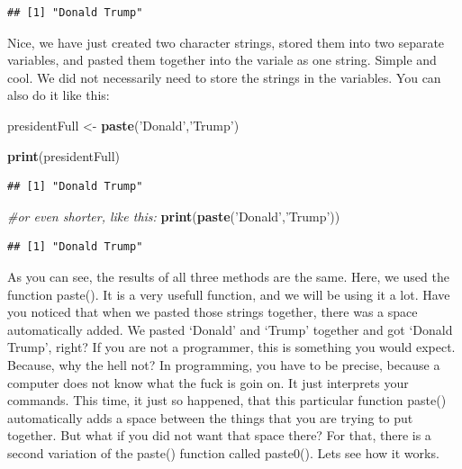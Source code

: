 \documentclass[]{book}
\newenvironment{Shaded}{\begin{snugshade}}{\end{snugshade}}
\newcommand{\CommentTok}[1]{\textcolor[rgb]{0.56,0.35,0.01}{\textit{#1}}}
\newcommand{\KeywordTok}[1]{\textcolor[rgb]{0.13,0.29,0.53}{\textbf{#1}}}
\newcommand{\NormalTok}[1]{#1}
\newcommand{\StringTok}[1]{\textcolor[rgb]{0.31,0.60,0.02}{#1}}
\begin{document}
\begin{verbatim}
## [1] "Donald Trump"
\end{verbatim}

Nice, we have just created two character strings, stored them into two separate variables, and pasted them together into the variale as one string. Simple and cool. We did not necessarily need to store the strings in the variables. You can also do it like this:

\begin{Shaded}
\begin{Highlighting}[]
\NormalTok{presidentFull <-}\StringTok{ }\KeywordTok{paste}\NormalTok{(}\StringTok{'Donald'}\NormalTok{,}\StringTok{'Trump'}\NormalTok{)}

\KeywordTok{print}\NormalTok{(presidentFull)}
\end{Highlighting}
\end{Shaded}

\begin{verbatim}
## [1] "Donald Trump"
\end{verbatim}

\begin{Shaded}
\begin{Highlighting}[]
\CommentTok{#or even shorter, like this:}
\KeywordTok{print}\NormalTok{(}\KeywordTok{paste}\NormalTok{(}\StringTok{'Donald'}\NormalTok{,}\StringTok{'Trump'}\NormalTok{))}
\end{Highlighting}
\end{Shaded}

\begin{verbatim}
## [1] "Donald Trump"
\end{verbatim}

As you can see, the results of all three methods are the same. Here, we used the function paste(). It is a very usefull function, and we will be using it a lot. Have you noticed that when we pasted those strings together, there was a space automatically added. We pasted `Donald' and `Trump' together and got `Donald Trump', right? If you are not a programmer, this is something you would expect. Because, why the hell not? In programming, you have to be precise, because a computer does not know what the fuck is goin on. It just interprets your commands. This time, it just so happened, that this particular function paste() automatically adds a space between the things that you are trying to put together. But what if you did not want that space there? For that, there is a second variation of the paste() function called paste0(). Lets see how it works.
\end{document}
